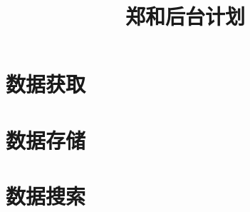 \documentclass[UTF8]{ctexrep}
\title{郑和后台计划}
\begin{document}
\maketitle
\newpage

    

\part{数据获取}


\part{数据存储}


\part{数据搜索}

\end{document}
